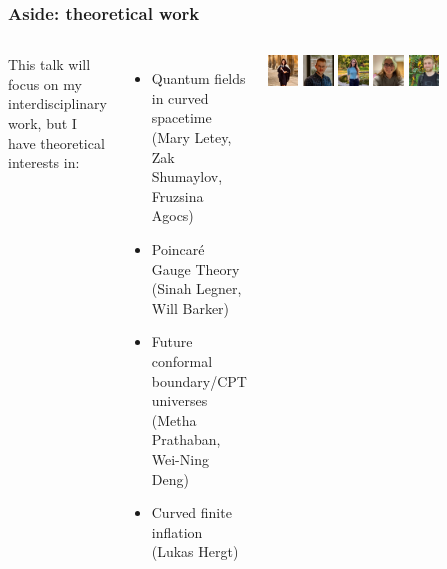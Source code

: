 \documentclass[aspectratio=169, handout]{beamer}
\begin{document}
\begin{frame}
    \frametitle{Aside: theoretical work}
    \begin{columns}

        This talk will focus on my interdisciplinary work, but I have theoretical interests in:
        \begin{itemize}
            \item Quantum fields in curved spacetime \\\hfill {\small (Mary Letey, Zak Shumaylov, Fruzsina Agocs)}
            \item Poincar\'{e} Gauge Theory \\\hfill {\small (Sinah Legner, Will Barker)}
            \item Future conformal boundary/CPT universes \\\hfill {\small (Metha Prathaban, Wei-Ning Deng)}
            \item Curved finite inflation \hfill {\small (Lukas Hergt)}
        \end{itemize}
        \includegraphics[width=0.125\textwidth]{figures/students/mary_letey.jpg}%
        \includegraphics[width=0.125\textwidth]{figures/students/zak_shumaylov.jpg}%
        \includegraphics[width=0.125\textwidth]{figures/students/fruzsina_agocs.jpg}%
        \includegraphics[width=0.125\textwidth]{figures/students/sinah_legner.jpg}%
        \includegraphics[width=0.125\textwidth]{figures/students/will_barker.jpg}%

\end{columns}
\end{frame}
\end{document}
